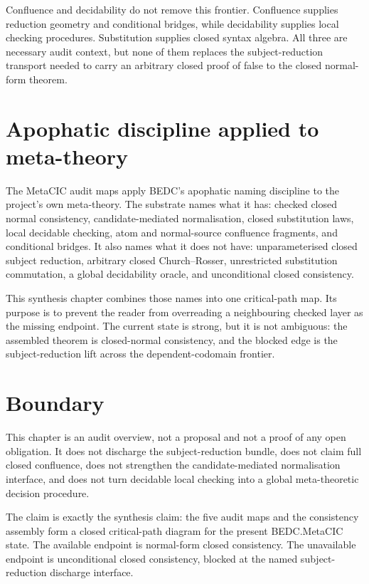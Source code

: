 Confluence and decidability do not remove this frontier. Confluence supplies
reduction geometry and conditional bridges, while decidability supplies local
checking procedures. Substitution supplies closed syntax algebra. All three are
necessary audit context, but none of them replaces the subject-reduction
transport needed to carry an arbitrary closed proof of false to the closed
normal-form theorem.

\section{Apophatic discipline applied to meta-theory}
\label{sec:metacic-audit-synthesis-apophatic}

The MetaCIC audit maps apply BEDC's apophatic naming discipline to the
project's own meta-theory. The substrate names what it has: checked closed
normal consistency, candidate-mediated normalisation, closed substitution
laws, local decidable checking, atom and normal-source confluence fragments, and
conditional bridges. It also names what it does not have: unparameterised closed
subject reduction, arbitrary closed Church--Rosser, unrestricted substitution
commutation, a global decidability oracle, and unconditional closed
consistency.

This synthesis chapter combines those names into one critical-path map. Its
purpose is to prevent the reader from overreading a neighbouring checked layer
as the missing endpoint. The current state is strong, but it is not ambiguous:
the assembled theorem is closed-normal consistency, and the blocked edge is the
subject-reduction lift across the dependent-codomain frontier.

\section{Boundary}
\label{sec:metacic-audit-synthesis-boundary}

This chapter is an audit overview, not a proposal and not a proof of any open
obligation. It does not discharge the subject-reduction bundle, does not claim
full closed confluence, does not strengthen the candidate-mediated
normalisation interface, and does not turn decidable local checking into a
global meta-theoretic decision procedure.

The claim is exactly the synthesis claim: the five audit maps and the
consistency assembly form a closed critical-path diagram for the present
BEDC.MetaCIC state. The available endpoint is normal-form closed consistency.
The unavailable endpoint is unconditional closed consistency, blocked at the
named subject-reduction discharge interface.

